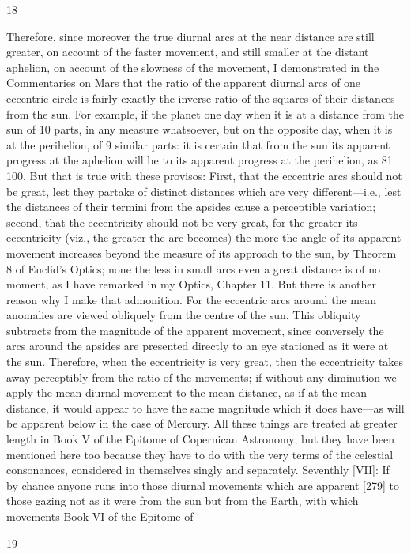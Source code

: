 \documentclass{article}
\begin{document}
18

Therefore, since moreover the true diurnal arcs at the near distance are
still greater, on account of the faster movement, and still smaller at the
distant aphelion, on account of the slowness of the movement, I
demonstrated in the Commentaries on Mars that the ratio of the
apparent diurnal arcs of one eccentric circle is fairly exactly the inverse
ratio of the squares of their distances from the sun. For example, if the
planet one day when it is at a distance from the sun of 10 parts, in any
measure whatsoever, but on the opposite day, when it is at the
perihelion, of 9 similar parts: it is certain that from the sun its apparent
progress at the aphelion will be to its apparent progress at the perihelion,
as 81 : 100.
But that is true with these provisos: First, that the eccentric arcs should
not be great, lest they partake of distinct distances which are very
different—i.e., lest the distances of their termini from the apsides cause a
perceptible variation; second, that the eccentricity should not be very
great, for the greater its eccentricity (viz., the greater the arc becomes)
the more the angle of its apparent movement increases beyond the
measure of its approach to the sun, by Theorem 8 of Euclid's Optics;
none the less in small arcs even a great distance is of no moment, as I
have remarked in my Optics, Chapter 11. But there is another reason why
I make that admonition. For the eccentric arcs around the mean
anomalies are viewed obliquely from the centre of the sun. This obliquity
subtracts from the magnitude of the apparent movement, since
conversely the arcs around the apsides are presented directly to an eye
stationed as it were at the sun. Therefore, when the eccentricity is very
great, then the eccentricity takes away perceptibly from the ratio of the
movements; if without any diminution we apply the mean diurnal
movement to the mean distance, as if at the mean distance, it would
appear to have the same magnitude which it does have—as will be
apparent below in the case of Mercury. All these things are treated at
greater length in Book V of the Epitome of Copernican Astronomy; but
they have been mentioned here too because they have to do with the very
terms of the celestial consonances, considered in themselves singly and
separately.
Seventhly [VII]: If by chance anyone runs into those diurnal movements
which are apparent [279] to those gazing not as it were from the sun but
from the Earth, with which movements Book VI of the Epitome of


19
\end{document}
